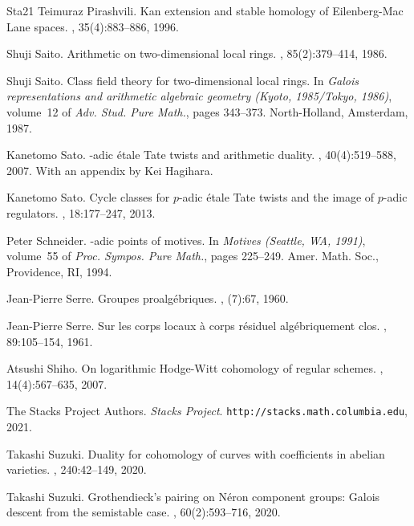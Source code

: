 \documentclass{amsart}
\theoremstyle{remark}
\numberwithin{equation}{subsection}
\begin{document}
\begin{thebibliography}{{Sta}21}
Teimuraz Pirashvili.
\newblock Kan extension and stable homology of {E}ilenberg-{M}ac {L}ane spaces.
, 35(4):883--886, 1996.

Shuji Saito.
\newblock Arithmetic on two-dimensional local rings.
, 85(2):379--414, 1986.

Shuji Saito.
\newblock Class field theory for two-dimensional local rings.
\newblock In {\em Galois representations and arithmetic algebraic geometry
  ({K}yoto, 1985/{T}okyo, 1986)}, volume~12 of {\em Adv. Stud. Pure Math.},
  pages 343--373. North-Holland, Amsterdam, 1987.

Kanetomo Sato.
-adic \'{e}tale {T}ate twists and arithmetic duality.
, 40(4):519--588, 2007.
\newblock With an appendix by Kei Hagihara.

Kanetomo Sato.
\newblock Cycle classes for {$p$}-adic \'{e}tale {T}ate twists and the image of
  {$p$}-adic regulators.
, 18:177--247, 2013.

Peter Schneider.
-adic points of motives.
\newblock In {\em Motives ({S}eattle, {WA}, 1991)}, volume~55 of {\em Proc.
  Sympos. Pure Math.}, pages 225--249. Amer. Math. Soc., Providence, RI, 1994.

Jean-Pierre Serre.
\newblock Groupes proalg\'ebriques.
, (7):67, 1960.

Jean-Pierre Serre.
\newblock Sur les corps locaux \`a corps r\'esiduel alg\'ebriquement clos.
, 89:105--154, 1961.

Atsushi Shiho.
\newblock On logarithmic {H}odge-{W}itt cohomology of regular schemes.
, 14(4):567--635, 2007.

The {Stacks Project Authors}.
\newblock \textit{Stacks Project}.
\newblock \verb+http://stacks.math.columbia.edu+, 2021.

Takashi Suzuki.
\newblock Duality for cohomology of curves with coefficients in abelian
  varieties.
, 240:42--149, 2020.

Takashi Suzuki.
\newblock Grothendieck's pairing on {N}\'{e}ron component groups: {G}alois
  descent from the semistable case.
, 60(2):593--716, 2020.


\end{thebibliography}
\end{document}
